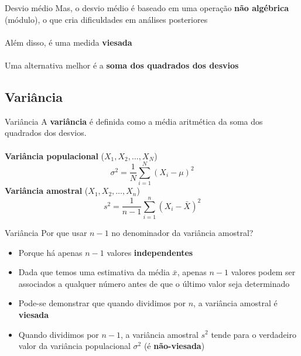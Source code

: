 \documentclass[10pt]{beamer}\usepackage[]{graphicx}\usepackage[]{color}
\theoremstyle{definition}
\begin{document}
\begin{frame}{Desvio médio}
  Mas, o desvio médio é baseado em uma operação \textbf{não algébrica}
  (módulo), o que cria dificuldades em análises posteriores \\~\\
  Além disso, é uma medida \textbf{viesada} \\~\\
  Uma alternativa melhor é a \textbf{soma dos quadrados dos desvios}
\end{frame}

\subsection{Variância}

\begin{frame}{Variância}
  A \textbf{variância} é definida como a média aritmética da soma dos
  quadrados dos desvios.\\~\\
  \textbf{Variância populacional} ($X_1, X_2, \ldots, X_N$)
  \begin{equation*}
    \sigma^2 = \frac{1}{N} \sum_{i=1}^{N} (X_i - \mu)^2
  \end{equation*}
  \vspace{1em}
    \textbf{Variância amostral} ($X_1, X_2, \ldots, X_n$)
  \begin{equation*}
    s^2 = \frac{1}{n-1} \sum_{i=1}^{n} (X_i - \bar{X})^2
  \end{equation*}
\end{frame}

\begin{frame}{Variância}
  Por que usar $n-1$ no denominador da variância amostral?
  \begin{itemize}
  \item Porque há apenas $n-1$ valores \textbf{independentes}
  \item Dada que temos uma estimativa da média $\bar{x}$, apenas $n-1$
    valores podem ser associados a qualquer número antes de que o último
    valor seja determinado
  \item Pode-se demonstrar que quando dividimos por $n$, a variância
    amostral é \textbf{viesada}
  \item Quando dividimos por $n-1$, a variância amostral $s^2$ tende
    para o verdadeiro valor da variância populacional $\sigma^2$ (é
    \textbf{não-viesada})
  \end{itemize}
\end{frame}
\end{document}

